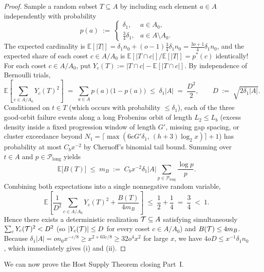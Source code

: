 \begin{proof}
Sample a random subset $T \subseteq A$ by including each element $a \in A$ independently with probability
\[
  p(a) \;:=\; \begin{cases} \delta_1, & a \in A_0, \\ \frac{3}{4}\delta_1, & a \in A \setminus A_0. \end{cases}
\]
The expected cardinality is $\mathbb{E}[|T|] = \delta_1 n_0 + (o - 1)\frac{3}{4}\delta_1 n_0 = \frac{3o + 1}{4}\delta_1 n_0$, and the expected share of each coset $c \in A/A_0$ is $\mathbb{E}[|T \cap c|] / \mathbb{E}[|T|] = p^*(c)$ identically! For each coset $c \in A/A_0$, put $Y_c(T) := |T \cap c| - \mathbb{E}[|T \cap c|]$. By independence of Bernoulli trials,
\[
  \mathbb{E}\!\left[\sum_{c \in A/A_0} Y_c(T)^2\right] \;=\; \sum_{a \in A} p(a)\bigl(1 - p(a)\bigr) \;\le\; \delta_1 |A| \;=\; \frac{D^2}{2}, \qquad D \;:=\; \sqrt{2\delta_1 |A|}.
\]
Conditioned on $t \in T$ (which occurs with probability $\le \delta_1$), each of the three good-orbit failure events along a long Frobenius orbit of length $L_2 \le L_b$ (excess density inside a fixed progression window of length $G'$, missing gap spacing, or cluster exceedance beyond $N_1 = \lceil \max(6e G'\delta_1,\, (h+3)\log_2 x)\rceil + 1$) has probability at most $C_b x^{-2}$ by Chernoff's binomial tail bound. Summing over $t \in A$ and $p \in \mathcal{P}_{\mathrm{long}}$ yields
\[
  \mathbb{E}\bigl[B(T)\bigr] \;\le\; m_B \;:=\; C_b x^{-2}\delta_1 |A| \sum_{p \in \mathcal{P}_{\mathrm{long}}} \frac{\log p}{p}.
\]
Combining both expectations into a single nonnegative random variable,
\[
  \mathbb{E}\!\left[\frac{1}{D^2}\sum_{c \in A/A_0} Y_c(T)^2 + \frac{B(T)}{4 m_B}\right] \;\le\; \frac{1}{2} + \frac{1}{4} \;=\; \frac{3}{4} \;<\; 1.
\]
Hence there exists a deterministic realization $\mathcal{T} \subseteq A$ satisfying simultaneously $\sum_c Y_c(\mathcal{T})^2 < D^2$ (so $|Y_c(\mathcal{T})| \le D$ for every coset $c \in A/A_0$) and $B(\mathcal{T}) \le 4 m_B$. Because $\delta_1 |A| = o n_0 x^{-\varepsilon/8} \ge x^{2 + 63\varepsilon/8} \ge 32 o^4 x^2$ for large $x$, we have $4 o D \le x^{-1}\delta_1 n_0$, which immediately gives (i) and (ii).
\end{proof}

We can now prove the Host Supply Theorem closing Part~I.

